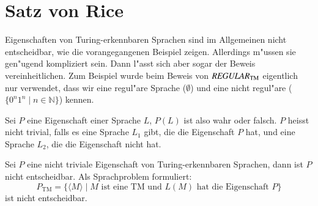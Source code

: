 \section{Satz von Rice}
Eigenschaften von Turing-erkennbaren Sprachen sind im Allgemeinen
nicht entscheidbar, wie die vorangegangenen Beispiel zeigen.
Allerdings m"ussen sie gen"u\-gend kompliziert sein.
Dann l"asst
sich aber sogar der Beweis vereinheitlichen.
Zum Beispiel wurde
beim Beweis von $\text{\it REGULAR}_{\text{TM}}$ eigentlich
nur verwendet, dass wir eine regul"are Sprache ($\emptyset$) und
eine nicht regul"are ($\{0^n1^n\;|\;n\in\mathbb N\}$) kennen.

\begin{definition}
%
Sei $P$ eine Eigenschaft einer Sprache $L$, $P(L)$ ist also wahr oder
falsch.
$P$ heisst nicht trivial, falls es eine Sprache $L_1$ gibt,
die die Eigenschaft $P$ hat, und eine Sprache $L_2$, die die
Eigenschaft nicht hat.
\end{definition}

\begin{satz}[Rice]
%
\label{rice-theorem}
Sei $P$ eine nicht triviale Eigenschaft von Turing-erkennbaren Sprachen,
dann ist $P$ nicht entscheidbar.
Als Sprachproblem formuliert:
\[
P_{\text{TM}}=\{ \langle M\rangle\;|\;
\text{$M$ ist eine TM und $L(M)$ hat die Eigenschaft $P$}
\}
\]
ist nicht entscheidbar.
\end{satz}

